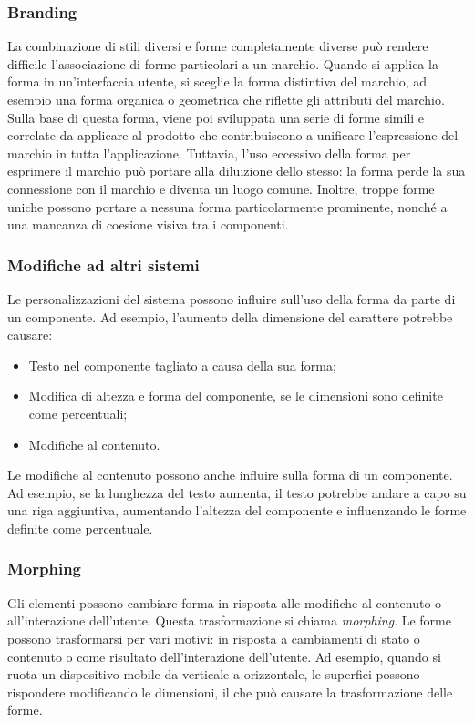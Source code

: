 \documentclass[12pt, a4paper]{report}
\begin{document}
	\subsubsection{Branding}
	La combinazione di stili diversi e forme completamente diverse può rendere difficile l'associazione di forme particolari a un marchio. Quando si applica la forma in un'interfaccia utente, si sceglie la forma distintiva del marchio, ad esempio una forma organica o geometrica che riflette
	gli attributi del marchio. Sulla base di questa forma,  viene poi sviluppata una serie di forme simili e correlate da applicare al prodotto che contribuiscono a unificare l'espressione del marchio in tutta l'applicazione. Tuttavia, l'uso eccessivo della forma per esprimere il marchio può portare
	alla diluizione dello stesso: la forma perde la sua connessione con il marchio e diventa un luogo comune. Inoltre, troppe forme uniche possono portare a nessuna forma particolarmente prominente, nonché a una mancanza di coesione visiva tra i componenti.

	\subsubsection{Modifiche ad altri sistemi}
	Le personalizzazioni del sistema possono influire sull'uso della forma da parte di un componente. Ad esempio, l'aumento della dimensione del carattere potrebbe causare:
	\begin{itemize}
		\item Testo nel componente tagliato a causa della sua forma;
		\item Modifica di altezza e forma del componente, se le dimensioni sono definite come percentuali;
		\item Modifiche al contenuto.
	\end{itemize}
	Le modifiche al contenuto possono anche influire sulla forma di un componente. Ad esempio, se la lunghezza del testo aumenta, il testo potrebbe andare a capo su una riga aggiuntiva, aumentando l'altezza del componente e influenzando le forme definite come percentuale.

	\subsubsection{Morphing}
	Gli elementi possono cambiare forma in risposta alle modifiche al contenuto o all'interazione dell'utente. Questa trasformazione si chiama \textit{morphing}. Le forme possono trasformarsi per vari motivi: in risposta a cambiamenti di stato o contenuto o come risultato dell'interazione dell'utente. Ad esempio, quando si ruota un
	dispositivo mobile da verticale a orizzontale, le superfici possono rispondere modificando le dimensioni, il che può causare la trasformazione delle forme. 
\end{document}
